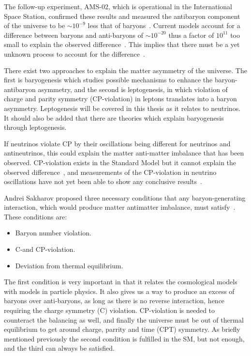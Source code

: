 The follow-up experiment, AMS-02, which is operational in the International Space Station, confirmed these results and measured the antibaryon component of the universe to be $\sim 10^{-9}$ less that of baryons~\cite{16AMS2}. Current models account for a difference between baryons and anti-baryons of $\sim 10^{-20}$  thus a factor of $10^{11}$ too small to explain the observed difference~\cite{49Matter}. This implies that there must be a yet unknown process to account for the difference~\cite{105Fukugita}.

There exist two approaches to explain the matter asymmetry of the universe. The first is baryogenesis which studies possible mechanisms to enhance the baryon-antibaryon asymmetry, and the second is leptogenesis, in which violation of charge and parity symmetry (CP-violation) in leptons translates into a baryon asymmetry. Leptogenesis will be covered in this thesis as it relates to neutrinos. It should also be added that there are theories which explain baryogenesis through leptogenesis.

If neutrinos violate CP by their oscillations being different for neutrinos and antineutrinos, this could explain the matter anti-matter imbalance that has been observed. CP-violation exists in the Standard Model but it cannot explain the observed difference~\cite{3Peskin}, and measurements of the CP-violation in neutrino oscillations have not yet been able to show any conclusive results~\cite{17Gonzalez}.

Andrei Sakharov proposed three necessary conditions that any baryon-generating interaction, which would produce matter antimatter imbalance, must satisfy~\cite{37Sakharov}. These conditions are:
\begin{itemize}
\item Baryon number violation.
\item C-and CP-violation. %
\item Deviation from thermal equilibrium.
\end{itemize}

The first condition is very important in that it relates the cosmological models with models in particle physics. It also gives us a way to produce an excess of baryons over anti-baryons, as long as there is no reverse interaction, hence requiring the charge symmetry (C) violation. CP-violation is needed to counteract the balancing as well, and finally the universe must be out of thermal equilibrium to get around charge, parrity and time (CPT) symmetry. As briefly mentioned previously the second condition is fulfilled in the SM, but not enough, and the third can always be satisfied.

